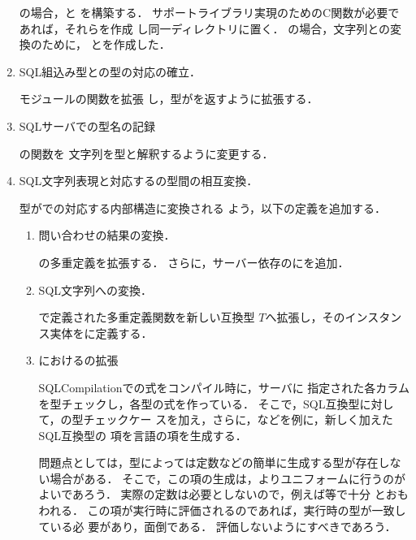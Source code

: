 \begin{enumerate}
	の場合，と
を構築する．
	サポートライブラリ実現のためのC関数が必要であれば，それらを作成
し同一ディレクトリに置く．
	の場合，文字列との変換のために，
とを作成した．

\item SQL組込み型と\smlsharp{}の型の対応の確立．

	モジュールの関数を拡張
し，型がを返すように拡張する．

\item SQLサーバでの型名の記録

	の関数を
文字列を型と解釈するように変更する．

\item SQL文字列表現と対応する\smlsharp{}の型間の相互変換．

	型が\smlsharp{}での対応する内部構造に変換される
よう，以下の定義を追加する．
\begin{enumerate}
\item 問い合わせの結果の変換．

	の多重定義を拡張する．
	さらに，サーバー依存のにを追加．

\item SQL文字列への変換．

	で定義された多重定義関数を新しい互換型
$T$へ拡張し，そのインスタンス実体をに定義する．

\item {}におけるの拡張

	
	SQLCompilationでの式をコンパイル時に，サーバに
指定された各カラムを型チェックし，各型の式を作っている．
	そこで，SQL互換型に対して，の型チェックケー
スを加え，さらに，などを例に，新しく加えたSQL互換型の
項を言語の項を生成する．
	
	問題点としては，型によっては定数などの簡単に生成する型が存在しな
い場合がある．
	そこで，この項の生成は，よりユニフォームに行うのがよいであろう．
	実際の定数は必要としないので，例えば等で十分
とおもわれる．
	この項が実行時に評価されるのであれば，実行時の型が一致している必
要があり，面倒である．
	評価しないようにすべきであろう．
\end{enumerate}
\end{enumerate}


